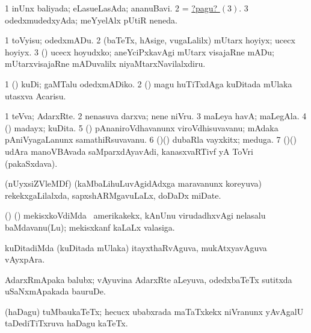 \noindent 
\gl{\pagu}
\expl{}
\bmng
\bnum
\num{1}  inUnx baliyada; eLasueLasAda; ananuBavi. 
\num{2}  = \hyperlink{wet pagu3}{?pagu? \((3)\)}. 
\hypertarget{wet pagu3}{} 
\num{3}  odedxmudedxyAda; meYyelAlx pUtiR neneda. 
\enum
\emng
\eentry

\bentry
{} 
\gl{\sakirx}
\bmng
\bnum
\num{1} toVyisu; odedxmADu.
\num{2} (baTeTx, hAsige, \mo vugaLalilx) mUtarx hoyiyx; ucecx hoyiyx. 
\num{3} (\AtAmx) ucecx hoyudxko; aneYciPxkavAgi mUtarx visajaRne mADu; mUtarxvisajaRne mADuvalilx niyaMtarxNavilalxdiru. 
\enum
\emng

\noindent 
\gl{\pagu}
\expl{}
\bmng
\bnum
\num{1}  (\AmA) kuDi; gaMTalu odedxmADiko. 
\num{2}  (\ashi) magu huTiTxdAga kuDitada mUlaka utasxva Acarisu. 
\enum
\emng
\eentry

\bentry
{} 
\gl{\nA}
\expl{}
\bmng
\bnum
\num{1} teVva; AdarxRte. 
\num{2} nenasuva darxva; nene niVru. 
\num{3} maLeya havA; maLegAla. 
\num{4} (\AmA) madayx; kuDita. 
\num{5} (\ame) pAnaniroVdhavanunx viroVdhisuvavanu; mAdaka pAniVyagaLanunx samathiRsuvavanu. 
\num{6} (\birx)(\AmA) dubaRla vayxkitx; meduga. 
\num{7} (\birx)(\rAshA) udAra manoVBAvada saMparxdAyavAdi, kanasxvaRTivf yA ToVri (pakaSxdava). 
\enum
\emng
\eentry

\bentry
{} 
\gl{\nA}
\expl{}
\bmng
(nUyxsiZVleMDf) (kaMbaLihuLuvAgidAdxga maravanunx koreyuva) rekekxgaLilalxda, sapxshARMgavuLaLx, doDaDx miDate. 
\emng
\eentry

\bentry
{} 
\gl{\nA}
\expl{}
\bmng
(\ame) (\AmA) mekisxkoVdiMda \kanu\ amerikakekx, kAnUnu virudadhxvAgi nelasalu baMdavanu(Lu); mekisxkanf kaLaLx valasiga. 
\emng
\eentry

\bentry
{} 
\gl{\nA}
\expl{}
\bmng
kuDitadiMda (kuDitada mUlaka) itayxthaRvAguva, mukAtxyavAguva vAyxpAra. 
\emng
\eentry

\bentry
{} 
\gl{\nA}
\expl{}
\bmng
AdarxRmApaka balubx; vAyuvina AdarxRte aLeyuva, odedxbaTeTx sutitxda uSaNxmApakada bauruDe. 
\emng
\eentry

\bentry
{} 
\gl{\nA}
\expl{}
\bmng
(haDagu) tuMbaukaTeTx; hecucx ubabxrada maTaTxkekx niVranunx yAvAgalU taDediTiTxruva haDagu kaTeTx. 
\emng
\eentry

